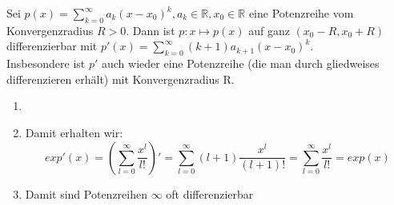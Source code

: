 
\setcounter{Satz}{6} 
\begin{Satz}{
	Sei $p \left( x\right) = \sum_{k=0}^{ \infty}
	{ a_k \left( x-x_0\right)^k}, a_k \in 
	\mathbb{R} ,x_0 \in \mathbb{R}$ eine Potenzreihe vom Konvergenzradius 
	$R >0 $. Dann ist $p : x \mapsto p\left(x\right)$ auf ganz 
	$\left( x_0-R, x_0+R \right)$ differenzierbar mit 
	$p'\left( x \right) = \sum_{k=0}^\infty {\left( k+1\right) 
	a_{k+1} \left(x-x_0\right)^k}$.\\
	Insbesondere ist $p'$ auch wieder eine Potenzreihe 
	(die man durch gliedweises differenzieren erhält) mit	Konvergenzradius R.
}\end{Satz}

\begin{Bemerkung}{
	\begin{enumerate}
		\item[ ]
		\item Damit erhalten wir: 
		\begin{equation*}
			exp'\left(x\right) = \left( \sum_{l=0}^{\infty} \frac{x^l}{l!}\right)' 
			= \sum_{l=0}^{\infty} \left(l+1\right) \frac{x^l}{(l+1)!} 
			= \sum_{l=0}^{\infty} \frac{x^l}{l!} = exp(x)
		\end{equation*}
		\item Damit sind Potenzreihen $\infty$ oft differenzierbar
	\end{enumerate}
}\end{Bemerkung}

